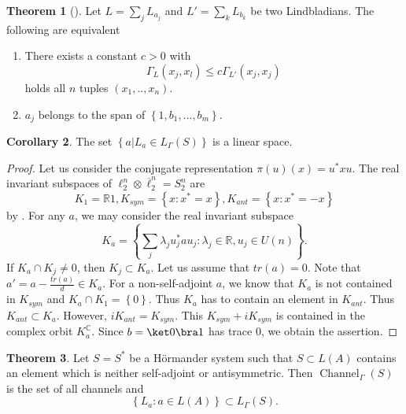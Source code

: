 \documentclass[11pt,reqno]{amsart}
\theoremstyle{definition}
\newtheorem{theorem}{Theorem}[section]
\newtheorem{corollary}[theorem]{Corollary}
\newtheorem{lemma}[theorem]{Lemma}
\newcommand{\mb}{\mathbb}
\newcommand{\lset}{\left\{ }
\newcommand{\rset}{\right\} }
\newcommand{\kl}{\leq}
\DeclareMathOperator{\chan}{Channel}
\begin{document}
\begin{theorem}[\cite{JW}]
    Let $L=\sum_j L_{a_j}$ and $L'=\sum_k L_{b_k}$ be two Lindbladians. The following are equivalent
    \begin{enumerate}
        \item There exists a constant $c>0$ with 
            \[ \Gamma_{L}(x_j,x_l) \kl c \Gamma_{L'}(x_j,x_j) \]
            holds all $n$ tuples $(x_1,..,x_n)$. 
        \item $a_j$ belongs to the span of $\lset 1,b_1,\dots ,b_m\rset $.
    \end{enumerate} 
\end{theorem}

\begin{corollary}
    The set $\lset a| L_a\in L_{\Gamma}(S)\rset $ is a linear space.  
\end{corollary} 


\begin{proof} 
    Let us consider the conjugate representation $\pi(u)(x)=u^*xu$. The real invariant subspaces of $\ell_2^n\otimes \overline{\ell}_2^n=S_2^n$ are 
    \[ K_1= \mb R 1 , K_{sym} = \lset x: x^*=x\rset   , K_{ant} = \lset x:x^*=-x\rset   \] 
    by \cite{approx_cloning}. For any $a$, we may consider the real invariant subspace $$K_a=\lset\sum_j \lambda_j u_j^*au_j: \lambda_j\in \mb R, u_j\in U(n)\rset.$$ If $K_a\cap K_j\neq 0$, then $K_j\subset K_a$. Let us assume that $tr(a)=0$. Note that $a'=a-\frac{tr(a)}{d}\in K_a$. For a non-self-adjoint $a$, we know that $K_a$ is not contained in $K_{sym}$ and $K_a\cap K_1=\lset 0\rset $. Thus $K_a$ has to contain an element in $K_{ant}$. Thus $K_{ant}\subset K_a$. However, $iK_{ant}=K_{sym}$. This $K_{sym}+iK_{sym}$ is contained in the complex orbit $K_a^{\mb C}$. Since $b=\ket 0\bra 1$ has trace $0$, we obtain the assertion.
\end{proof}    

                                            


\begin{theorem}
    Let $S=S^*$ be a H\"ormander system such that $S\subset L(A)$ contains an element which is neither self-adjoint or antisymmetric. Then $\chan_{\Gamma}(S)$ is the set of all channels and 
    \[ \lset L_a: a\in L(A)\rset  \subset L_{\Gamma}(S)    .\] 
\end{theorem}  
\end{document}
